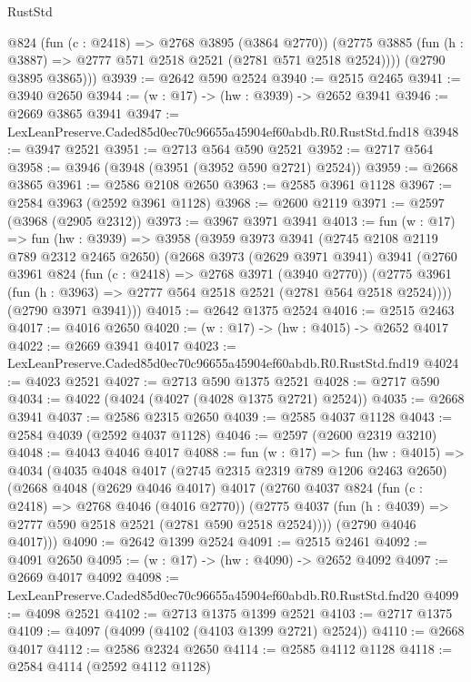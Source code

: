 \begin{lexlean}{RustStd}
\begin{coremodule}
          @824
          (fun (c : @2418) => @2768 @3895 (@3864 @2770))
          (@2775 @3885 (fun (h : @3887) => @2777 @571 @2518 @2521 (@2781 @571 @2518 @2524))))
        (@2790 @3895 @3865)))
@3939 := @2642 @590 @2524
@3940 := @2515 @2465
@3941 := @3940 @2650
@3944 := (w : @17) -> (hw : @3939) -> @2652 @3941
@3946 := @2669 @3865 @3941
@3947 := LexLeanPreserve.Caded85d0ec70c96655a45904ef60abdb.R0.RustStd.fnd18
@3948 := @3947 @2521
@3951 := @2713 @564 @590 @2521
@3952 := @2717 @564
@3958 := @3946 (@3948 (@3951 (@3952 @590 @2721) @2524))
@3959 := @2668 @3865
@3961 := @2586 @2108 @2650
@3963 := @2585 @3961 @1128
@3967 := @2584 @3963 (@2592 @3961 @1128)
@3968 := @2600 @2119
@3971 := @2597 (@3968 (@2905 @2312))
@3973 := @3967 @3971 @3941
@4013 := fun (w : @17) =>
  fun (hw : @3939) =>
  @3958
    (@3959
      @3973
      @3941
      (@2745 @2108 @2119 @789 @2312 @2465 @2650)
      (@2668
        @3973
        (@2629 @3971 @3941)
        @3941
        (@2760
          @3961
          @824
          (fun (c : @2418) => @2768 @3971 (@3940 @2770))
          (@2775 @3961 (fun (h : @3963) => @2777 @564 @2518 @2521 (@2781 @564 @2518 @2524))))
        (@2790 @3971 @3941)))
@4015 := @2642 @1375 @2524
@4016 := @2515 @2463
@4017 := @4016 @2650
@4020 := (w : @17) -> (hw : @4015) -> @2652 @4017
@4022 := @2669 @3941 @4017
@4023 := LexLeanPreserve.Caded85d0ec70c96655a45904ef60abdb.R0.RustStd.fnd19
@4024 := @4023 @2521
@4027 := @2713 @590 @1375 @2521
@4028 := @2717 @590
@4034 := @4022 (@4024 (@4027 (@4028 @1375 @2721) @2524))
@4035 := @2668 @3941
@4037 := @2586 @2315 @2650
@4039 := @2585 @4037 @1128
@4043 := @2584 @4039 (@2592 @4037 @1128)
@4046 := @2597 (@2600 @2319 @3210)
@4048 := @4043 @4046 @4017
@4088 := fun (w : @17) =>
  fun (hw : @4015) =>
  @4034
    (@4035
      @4048
      @4017
      (@2745 @2315 @2319 @789 @1206 @2463 @2650)
      (@2668
        @4048
        (@2629 @4046 @4017)
        @4017
        (@2760
          @4037
          @824
          (fun (c : @2418) => @2768 @4046 (@4016 @2770))
          (@2775 @4037 (fun (h : @4039) => @2777 @590 @2518 @2521 (@2781 @590 @2518 @2524))))
        (@2790 @4046 @4017)))
@4090 := @2642 @1399 @2524
@4091 := @2515 @2461
@4092 := @4091 @2650
@4095 := (w : @17) -> (hw : @4090) -> @2652 @4092
@4097 := @2669 @4017 @4092
@4098 := LexLeanPreserve.Caded85d0ec70c96655a45904ef60abdb.R0.RustStd.fnd20
@4099 := @4098 @2521
@4102 := @2713 @1375 @1399 @2521
@4103 := @2717 @1375
@4109 := @4097 (@4099 (@4102 (@4103 @1399 @2721) @2524))
@4110 := @2668 @4017
@4112 := @2586 @2324 @2650
@4114 := @2585 @4112 @1128
@4118 := @2584 @4114 (@2592 @4112 @1128)

\end{coremodule}
\end{lexlean}
